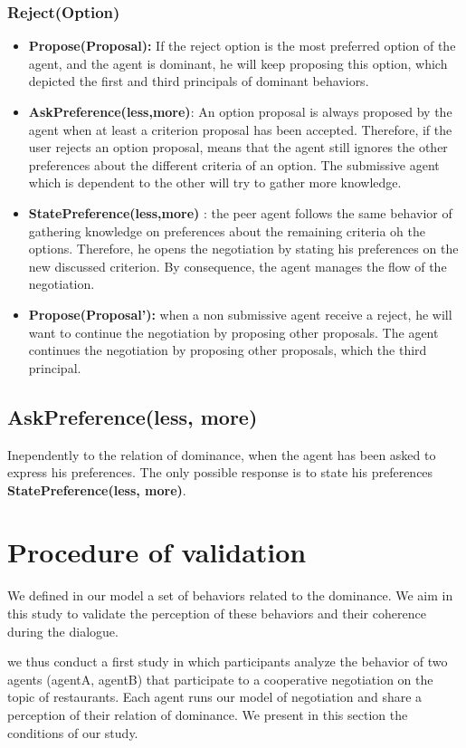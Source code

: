 \documentclass{llncs}
\begin{document}
 		
 		\subsubsection{Reject(Option)}
 		\begin{itemize}
 			\item \textbf{Propose(Proposal):} If the reject option is the most preferred option of the agent, and the agent is dominant, he will keep proposing this option, which depicted the first and third principals of dominant behaviors.
 			
 			\item \textbf{AskPreference(less,more)}: An option proposal is always proposed by the agent when at least a criterion proposal has been accepted. Therefore, if the user rejects an option proposal, means that the agent still ignores the other preferences about the different criteria of an option. The submissive agent which is dependent to the other will try to gather more knowledge.
 			
 			\item \textbf{StatePreference(less,more)} : the peer agent follows the same behavior of gathering knowledge on preferences about the remaining  criteria oh the options. Therefore, he opens the negotiation by stating his preferences on the new discussed criterion. By consequence, the agent manages the flow of the negotiation. 
 			
 			\item \textbf{Propose(Proposal'):} when a non submissive agent receive a reject, he will want to continue the negotiation by proposing other proposals. The agent continues the negotiation by proposing other proposals, which the third principal.
	\end{itemize}
\subsection{AskPreference(less, more)} Inependently to the relation of dominance, when the agent has been asked to express his preferences. The only possible response is to state his preferences \textbf{StatePreference(less, more)}.



\section{Procedure of validation}
We defined in our model a set of behaviors related to the dominance. We aim in this study to validate the perception of these behaviors and their coherence during the dialogue.
\par we thus conduct a first study in which participants analyze the behavior of  two agents (agentA, agentB)  that participate to a cooperative negotiation on the topic of restaurants. Each agent runs our model of negotiation and share a perception of their relation of dominance. We present in this section the conditions of our study.
\end{document}
